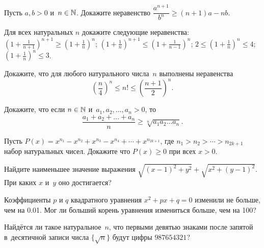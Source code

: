\documentclass[a4paper,12pt]{article}
\begin{document}
Пусть $a,b>0$ и~$n\in\mathbb{N}$. Докажите неравенство $\dfrac{a^{n+1}}{b^n}\geqslant(n+1)a-nb$.

Для всех натуральных $n$ докажите следующие неравенства:\\
$(1+\frac{1}{n+1})^{n+1}\geqslant(1+\frac{1}{n})^n$;
$(1+\frac{1}{n})^{n+1}\leqslant(1+\frac{1}{n-1})^n$;
$2\leqslant(1+\frac{1}{n})^n\leqslant4$;
$(1+\frac1n)^n\leqslant 3$.

Докажите, что для любого натурального числа~$n$ выполнены неравенства
$$
\left(\dfrac n4\right)^n\leqslant n!\leqslant\left(\dfrac{n+1}2\right)^n.
$$
\vspace{-6mm}

Докажите, что если $n\in\mathbb{N}$ и~$a_1,a_2,\ldots,a_n>0$, то
$$
\frac{a_1+a_2+\ldots+a_n}{n}\geqslant\sqrt[n]{a_1a_2\ldots a_n}.
$$
\vspace{-6mm}

Пусть $P(x) = x^{n_1} - x^{n_2} + x^{n_3} - x^{n_4} + \cdots + x^{n_{2k + 1}}$, где $n_1 > n_2 > \cdots > n_{2k + 1}$\т набор натуральных чисел. Докажите что $P(x) \geq 0$ при всех $x > 0$.

Найдите наименьшее значение выражения $\sqrt{(x-1)^2+y^2}+\sqrt{x^2+(y-1)^2}$. При каких $x$ и~$y$ оно достигается?

Коэффициенты $p$ и $q$ квадратного уравнения $x^2+px+q=0$ изменили не больше, чем на 0.01. Мог ли больший корень уравнения измениться больше, чем на 100? 

Найдётся ли такое натуральное~$n$, что первыми девятью знаками после запятой в~десятичной записи числа $\{\sqrt{n}\}$ будут цифры $987654321$?

\vfill
{}

\end{document}
